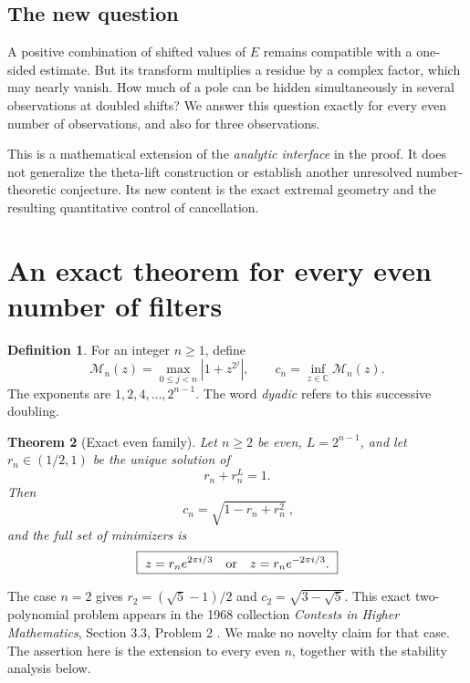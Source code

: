\documentclass[11pt,a4paper]{article}
\newtheorem{theorem}{Theorem}[section]
\theoremstyle{definition}\newtheorem{definition}[theorem]{Definition}
\theoremstyle{remark}\newtheorem{remark}[theorem]{Remark}
\newcommand{\C}{\mathbb C}\newcommand{\R}{\mathbb R}
\newcommand{\M}{\mathcal M}
\begin{document}
\subsection{The new question}
A positive combination of shifted values of $E$ remains compatible with a one-sided estimate. But its transform multiplies a residue by a complex factor, which may nearly vanish. How much of a pole can be hidden simultaneously in several observations at doubled shifts? We answer this question exactly for every even number of observations, and also for three observations.

This is a mathematical extension of the \emph{analytic interface} in the proof. It does not generalize the theta-lift construction or establish another unresolved number-theoretic conjecture. Its new content is the exact extremal geometry and the resulting quantitative control of cancellation.

\section{An exact theorem for every even number of filters}
\begin{definition}
For an integer $n\ge1$, define
\[
\M_n(z)=\max_{0\le j<n}|1+z^{2^j}|,\qquad
c_n=\inf_{z\in\C}\M_n(z).
\]
The exponents are $1,2,4,\ldots,2^{n-1}$. The word \emph{dyadic} refers to this successive doubling.
\end{definition}

\begin{theorem}[Exact even family]\label{thm:even}
Let $n\ge2$ be even, $L=2^{n-1}$, and let $r_n\in(1/2,1)$ be the unique solution of
\begin{equation}\label{eq:r-def}
r_n+r_n^L=1.
\end{equation}
Then
\begin{equation}\label{eq:even-value}
\boxed{\ c_n=\sqrt{1-r_n+r_n^2}\ },
\end{equation}
and the full set of minimizers is
\begin{equation}\label{eq:even-minimizers}
\boxed{\ z=r_n e^{2\pi i/3}\quad\hbox{or}\quad z=r_n e^{-2\pi i/3}.\ }
\end{equation}
\end{theorem}

The case $n=2$ gives $r_2=(\sqrt5-1)/2$ and $c_2=\sqrt{3-\sqrt5}$. This exact two-polynomial problem appears in the 1968 collection \emph{Contests in Higher Mathematics}, Section 3.3, Problem 2 \cite{contests}. We make no novelty claim for that case. The assertion here is the extension to every even $n$, together with the stability analysis below.
\end{document}
